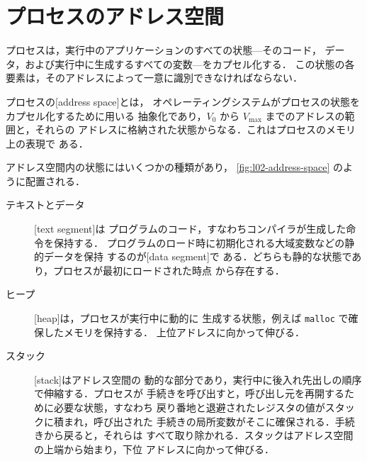 \documentclass[../main.tex]{subfiles}
\begin{document}
\section{プロセスのアドレス空間}
\label{sec:l02-address-space}

プロセスは，実行中のアプリケーションのすべての状態---そのコード，
データ，および実行中に生成するすべての変数---をカプセル化する．%
%
この状態の各要素は，そのアドレスによって一意に識別できなければならない．

\begin{definition}[アドレス空間]
  プロセスの[address space]とは，
  オペレーティングシステムがプロセスの状態をカプセル化するために用いる
  抽象化であり，$V_0$ から $V_{\max}$ までのアドレスの範囲と，それらの
  アドレスに格納された状態からなる．これはプロセスのメモリ上の表現で
  ある．
\end{definition}

アドレス空間内の状態にはいくつかの種類があり，
\cref{fig:l02-address-space} のように配置される．
\begin{description}
  \item[テキストとデータ]
    [text segment]は
    プログラムのコード，すなわちコンパイラが生成した命令を保持する．
    プログラムのロード時に初期化される大域変数などの静的データを保持
    するのが[data segment]で
    ある．どちらも静的な状態であり，プロセスが最初にロードされた時点
    から存在する．
  \item[ヒープ] [heap]は，プロセスが実行中に動的に
    生成する状態，例えば \texttt{malloc} で確保したメモリを保持する．
    上位アドレスに向かって伸びる．
  \item[スタック] [stack]はアドレス空間の
    動的な部分であり，実行中に後入れ先出しの順序で伸縮する．プロセスが
    手続きを呼び出すと，呼び出し元を再開するために必要な状態，すなわち
    戻り番地と退避されたレジスタの値がスタックに積まれ，呼び出された
    手続きの局所変数がそこに確保される．手続きから戻ると，それらは
    すべて取り除かれる．スタックはアドレス空間の上端から始まり，下位
    アドレスに向かって伸びる．

\end{description}
\end{document}
